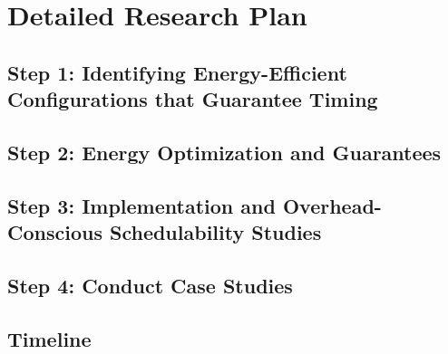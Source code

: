 \documentclass[10pt,letterpaper]{article}
\begin{document}

\section{Detailed Research Plan}
\label{sec:researchplan}



\subsection{Step 1: Identifying Energy-Efficient Configurations that Guarantee Timing}
\label{sec:step1}



\subsection{Step 2: Energy Optimization and Guarantees}
\label{sec:step2}



\subsection{Step 3: Implementation and Overhead-Conscious Schedulability Studies}
\label{sec:step3}



\subsection{Step 4: Conduct Case Studies}
\label{sec:step4}



\subsection{Timeline}
\label{sec:timeline}


\end{document}
